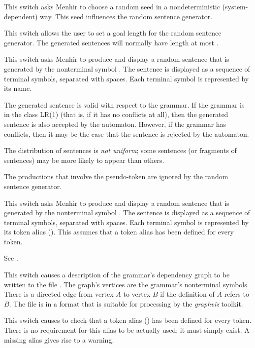 \documentclass[onecolumn,11pt,nocopyrightspace,preprint]{sigplanconf}
\begin{document}
\docswitch{\orandomselfinit} This switch asks Menhir to choose a random seed
in a nondeterministic (system-dependent) way. This seed influences the random
sentence generator.

 This switch allows the user to
set a goal length for the random sentence generator. The generated sentences
will normally have length at most .

 This switch asks Menhir to produce
and display a random sentence that is generated by the nonterminal symbol
. The sentence is displayed as a sequence of terminal symbols,
separated with spaces. Each terminal symbol is represented by its name.

The generated sentence is valid with respect to the grammar. If the grammar is
in the class LR(1) (that is, if it has no conflicts at all), then the
generated sentence is also accepted by the automaton. However, if the grammar
has conflicts, then it may be the case that the sentence is rejected by the
automaton.

The distribution of sentences is \emph{not uniform}; some sentences (or
fragments of sentences) may be more likely to appear than others.

The productions that involve the \error pseudo-token are ignored by the
random sentence generator.

 This switch asks Menhir to
produce and display a random sentence that is generated by the nonterminal
symbol . The sentence is displayed as a sequence of terminal
symbols, separated with spaces. Each terminal symbol is represented by its
token alias (). This assumes that a token alias has been
defined for every token.

\docswitch{\orawdepend} See .

\docswitch{\oreferencegraph} This switch causes a description of the grammar's
dependency graph to be written to the file \dott. The graph's
vertices are the grammar's nonterminal symbols. There is a directed edge from
vertex $A$ to vertex $B$ if the definition of $A$ refers to $B$. The file is
in a format that is suitable for processing by the \emph{graphviz} toolkit.

\docswitch{\orequirealiases} This switch causes \menhir to check that a token
alias () has been defined for every token. There is no
requirement for this alias to be actually used; it must simply exist. A
missing alias gives rise to a warning.
\end{document}
